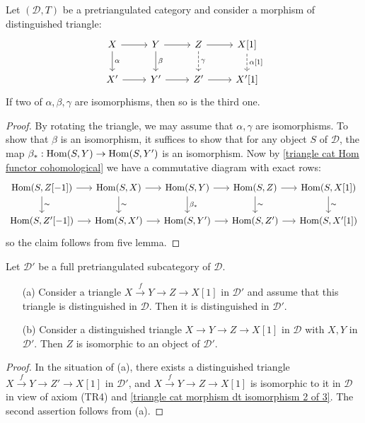 \begin{proposition}\label{triangle cat morphism dt isomorphism 2 of 3}
Let $(\mathcal{D},T)$ be a pretriangulated category and consider a morphism of distinguished triangle:
\[\begin{tikzcd}
X\ar[r]\ar[d,"\alpha"]&Y\ar[r]\ar[d,"\beta"]&Z\ar[r]\ar[d,dashed,"\gamma"]&X[1]\ar[d,dashed,"{\alpha[1]}"]\\
X'\ar[r]&Y'\ar[r]&Z'\ar[r]&X'[1]
\end{tikzcd}\]
If two of $\alpha,\beta,\gamma$ are isomorphisms, then so is the third one.
\end{proposition}
\begin{proof}
By rotating the triangle, we may assume that $\alpha,\gamma$ are isomorphisms. To show that $\beta$ is an isomorphism, it suffices to show that for any object $S$ of $\mathcal{D}$, the map $\beta_*:\mathrm{Hom}(S,Y)\to\mathrm{Hom}(S,Y')$ is an isomorphism. Now by \cref{triangle cat Hom functor cohomological} we have a commutative diagram with exact rows:
\[\begin{tikzcd}[column sep=5mm]
\Hom(S,Z[-1])\ar[r]\ar[d,"\sim"]&\Hom(S,X)\ar[r]\ar[d,"\sim"]&\Hom(S,Y)\ar[r]\ar[d,"\beta_*"]&\Hom(S,Z)\ar[r]\ar[d,"\sim"]&\Hom(S,X[1])\ar[d,"\sim"]\\
\Hom(S,Z'[-1])\ar[r]&\Hom(S,X')\ar[r]&\Hom(S,Y')\ar[r]&\Hom(S,Z')\ar[r]&\Hom(S,X'[1])
\end{tikzcd}\]
so the claim follows from five lemma.
\end{proof}

\begin{corollary}\label{triangle cat dt of subcategory prop}
Let $\mathcal{D}'$ be a full pretriangulated subcategory of $\mathcal{D}$.
\begin{enumerate}
    \item[(a)] Consider a triangle $X\stackrel{f}{\to} Y\to Z\to X[1]$ in $\mathcal{D}'$ and assume that this triangle is distinguished in $\mathcal{D}$. Then it is distinguished in $\mathcal{D}'$.
    \item[(b)] Consider a distinguished triangle $X\to Y\to Z\to X[1]$ in $\mathcal{D}$ with $X,Y$ in $\mathcal{D}'$. Then $Z$ is isomorphic to an object of $\mathcal{D}'$.
\end{enumerate}
\end{corollary}
\begin{proof}
In the situation of (a), there exists a distinguished triangle $X\stackrel{f}{\to} Y\to Z'\to X[1]$ in $\mathcal{D}'$, and $X\stackrel{f}{\to} Y\to Z\to X[1]$ is isomorphic to it in $\mathcal{D}$ in view of axiom (TR4) and \cref{triangle cat morphism dt isomorphism 2 of 3}. The second assertion follows from (a).
\end{proof}

